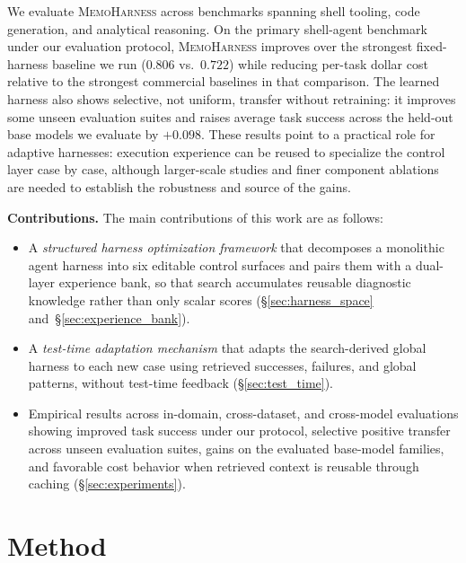 \documentclass{article}
\newcommand{\method}{\textsc{MemoHarness}\xspace}
\newcommand{\methodlabel}[1]{\noindent\textbf{\textcolor{narrareddeep}{#1}}}
\begin{document}
We evaluate \method across benchmarks spanning shell tooling, code
generation, and analytical reasoning. On the primary shell-agent
benchmark under our evaluation protocol, \method improves over the
strongest fixed-harness baseline we run ($0.806$ vs.\ $0.722$) while
reducing per-task dollar cost relative to the strongest commercial
baselines in that comparison. The learned harness also shows selective,
not uniform, transfer without retraining: it improves some unseen
evaluation suites and raises average task success across the held-out
base models we evaluate by $+0.098$. These results point to a practical
role for adaptive harnesses: execution experience can be reused to
specialize the control layer case by case, although larger-scale studies
and finer component ablations are needed to establish the robustness and
source of the gains.

\methodlabel{Contributions.}
The main contributions of this work are as follows:
\begin{itemize}[leftmargin=1.35em, itemsep=0pt, topsep=1pt, parsep=0pt, partopsep=0pt]
  \item A \emph{structured harness optimization framework} that
  decomposes a monolithic agent harness into six editable control
  surfaces and pairs them with a dual-layer experience bank, so that
  search accumulates reusable diagnostic knowledge rather than only
  scalar scores (\S\ref{sec:harness_space} and~\S\ref{sec:experience_bank}).
  \item A \emph{test-time adaptation mechanism} that adapts
  the search-derived global harness to each new case using retrieved
  successes, failures, and global patterns, without test-time feedback
  (\S\ref{sec:test_time}).
  \item Empirical results across in-domain, cross-dataset, and
  cross-model evaluations showing improved task success under our
  protocol, selective positive transfer across unseen evaluation suites,
  gains on the evaluated base-model families, and favorable cost behavior
  when retrieved context is reusable through caching
  (\S\ref{sec:experiments}).
\end{itemize}

\section{Method}
\label{sec:method}
\end{document}
